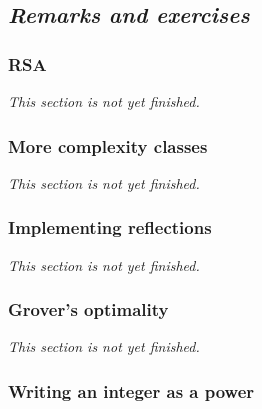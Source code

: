 \documentclass[fleqn,a4paper]{article}
\newenvironment{todo}{\color{primary}\emph{This section is not yet finished.}}{}
\theoremstyle{definition}
\theoremstyle{definition}
\theoremstyle{definition}
\theoremstyle{definition}
\theoremstyle{remark}
\begin{document}
\hypertarget{remarks-and-exercises-algorithms}{%
\subsection{\texorpdfstring{\emph{Remarks and exercises}}{Remarks and exercises}}\label{remarks-and-exercises-algorithms}}

\hypertarget{rsa}{%
\subsubsection{RSA}\label{rsa}}

\begin{todo}

\end{todo}

\hypertarget{more-complexity-classes}{%
\subsubsection{More complexity classes}\label{more-complexity-classes}}

\begin{todo}

\end{todo}

\hypertarget{implementing-reflections}{%
\subsubsection{Implementing reflections}\label{implementing-reflections}}

\begin{todo}

\end{todo}

\hypertarget{grovers-optimality}{%
\subsubsection{Grover's optimality}\label{grovers-optimality}}

\begin{todo}

\end{todo}

\hypertarget{checking-for-power-form}{%
\subsubsection{Writing an integer as a power}\label{checking-for-power-form}}
\end{document}
